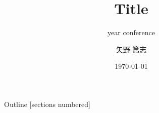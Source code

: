 \newcommand{\beamerDir}[0]{/mnt/c/Users/atsushi/Documents/workspace/env/Beamer/beamer/beamer/}





\title{Title}
\subtitle{year conference}
\author{矢野 篤志}
\date{\today}




\maketitle



\begin{frame}{Outline}
    [sections numbered]
    \scriptsize\tableofcontents[hideallsubsections]
\end{frame}









\lastpage

%     
%     


